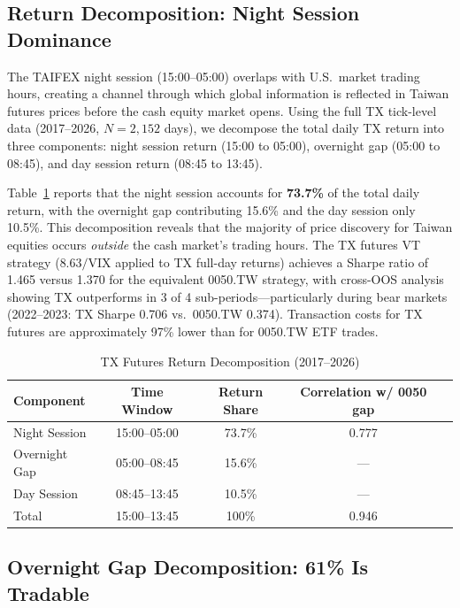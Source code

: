 \subsection{Return Decomposition: Night Session Dominance}
\label{sec:hf_return}

The TAIFEX night session (15:00--05:00) overlaps with U.S.\ market trading hours, creating a channel through which global information is reflected in Taiwan futures prices before the cash equity market opens. Using the full TX tick-level data (2017--2026, $N = 2{,}152$ days), we decompose the total daily TX return into three components: night session return (15:00 to 05:00), overnight gap (05:00 to 08:45), and day session return (08:45 to 13:45).

Table~\ref{tab:return_decomp} reports that the night session accounts for \textbf{73.7\%} of the total daily return, with the overnight gap contributing 15.6\% and the day session only 10.5\%. This decomposition reveals that the majority of price discovery for Taiwan equities occurs \textit{outside} the cash market's trading hours. The TX futures VT strategy ($8.63/\text{VIX}$ applied to TX full-day returns) achieves a Sharpe ratio of 1.465 versus 1.370 for the equivalent 0050.TW strategy, with cross-OOS analysis showing TX outperforms in 3 of 4 sub-periods---particularly during bear markets (2022--2023: TX Sharpe 0.706 vs.\ 0050.TW 0.374). Transaction costs for TX futures are approximately 97\% lower than for 0050.TW ETF trades.

\begin{table}[H]
\centering
\caption{TX Futures Return Decomposition (2017--2026)}
\label{tab:return_decomp}
\begin{tabular}{lcccc}
\toprule
Component & Time Window & Return Share & Correlation w/ 0050 gap \\
\midrule
Night Session & 15:00--05:00 & 73.7\% & 0.777 \\
Overnight Gap & 05:00--08:45 & 15.6\% & --- \\
Day Session & 08:45--13:45 & 10.5\% & --- \\
\midrule
Total & 15:00--13:45 & 100\% & 0.946 \\
\bottomrule
\end{tabular}
\end{table}


\subsection{Overnight Gap Decomposition: 61\% Is Tradable}
\label{sec:hf_gap}

